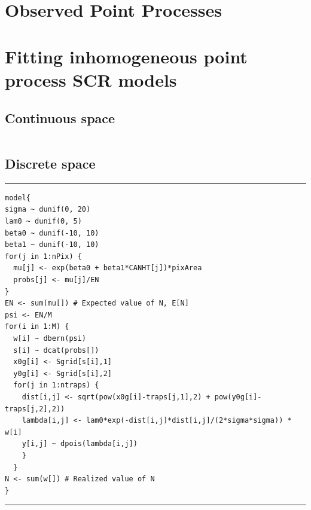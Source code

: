 \begin{gather*}
\end{gather*}


\section{Observed Point Processes}

\begin{figure}
\centering
\label{state-space.fig.hetero}
\end{figure}

\section{Fitting inhomogeneous point process SCR models}

\subsection{Continuous space}

\begin{figure}
  \centering
   \label{state-space.fig.fm1post}
\end{figure}

\begin{table}
\centering
\begin{tabular}{lrrrr}
\hline

\hline

\hline
\end{tabular}
\label{state-space.tab.simIPP}
\end{table}

\subsection{Discrete space}
\label{modeling.sec.discrete}


\begin{figure}[ht]
\centering

\label{state-space.fig.discrete}
\end{figure}

\begin{panel}%
\centering
\rule[0.15in]{\textwidth}{.03in}
\begin{small}
\begin{verbatim}
model{
sigma ~ dunif(0, 20)
lam0 ~ dunif(0, 5)
beta0 ~ dunif(-10, 10)
beta1 ~ dunif(-10, 10)
for(j in 1:nPix) {
  mu[j] <- exp(beta0 + beta1*CANHT[j])*pixArea
  probs[j] <- mu[j]/EN
}
EN <- sum(mu[]) # Expected value of N, E[N]
psi <- EN/M
for(i in 1:M) {
  w[i] ~ dbern(psi)
  s[i] ~ dcat(probs[])
  x0g[i] <- Sgrid[s[i],1]
  y0g[i] <- Sgrid[s[i],2]
  for(j in 1:ntraps) {
    dist[i,j] <- sqrt(pow(x0g[i]-traps[j,1],2) + pow(y0g[i]-traps[j,2],2))
    lambda[i,j] <- lam0*exp(-dist[i,j]*dist[i,j]/(2*sigma*sigma)) * w[i]
    y[i,j] ~ dpois(lambda[i,j])
    }
  }
N <- sum(w[]) # Realized value of N
}
\end{verbatim}
\end{small}
\rule[0.15in]{\textwidth}{.03in}
\caption{\bugs~code for fitting inhomogeneous point process model in
  discrete space.}
\label{state-space.panel1}
\end{panel}

